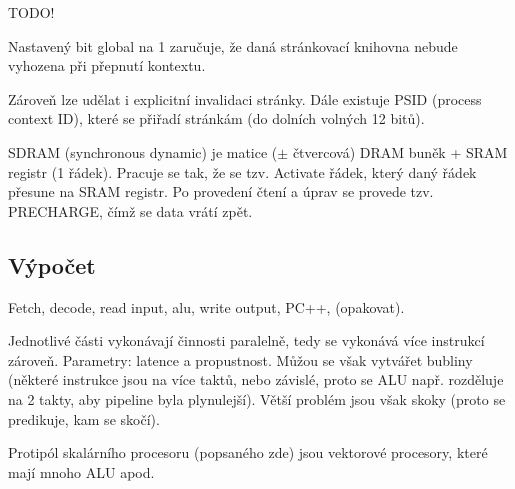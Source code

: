 \documentclass[12pt]{article}                   %
\begin{document}

        TODO!


        \begin{definice}
            Nastavený bit global na 1 zaručuje, že daná stránkovací knihovna nebude vyhozena při přepnutí kontextu.

            Zároveň lze udělat i explicitní invalidaci stránky. Dále existuje PSID (process context ID), které se přiřadí stránkám (do dolních volných 12 bitů).
        \end{definice}

        \begin{definice}
            SDRAM (synchronous dynamic) je matice ($±$ čtvercová) DRAM buněk + SRAM registr (1 řádek). Pracuje se tak, že se tzv. Activate řádek, který daný řádek přesune na SRAM registr. Po provedení čtení a úprav se provede tzv. PRECHARGE, čímž se data vrátí zpět.
        \end{definice}

    \subsection{Výpočet}
        \begin{poznamka}[Historicky]
            Fetch, decode, read input, alu, write output, PC++, (opakovat).
        \end{poznamka}

        \begin{definice}
            Jednotlivé části vykonávají činnosti paralelně, tedy se vykonává více instrukcí zároveň. Parametry: latence a propustnost. Můžou se však vytvářet bubliny (některé instrukce jsou na více taktů, nebo závislé, proto se ALU např. rozděluje na 2 takty, aby pipeline byla plynulejší). Větší problém jsou však skoky (proto se predikuje, kam se skočí).

            Protipól skalárního procesoru (popsaného zde) jsou vektorové procesory, které mají mnoho ALU apod.
        \end{definice}
\end{document}
